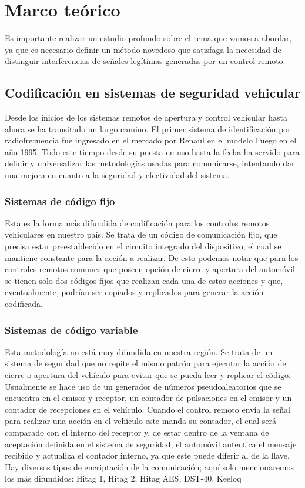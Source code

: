 \documentclass[12pt]{report}
\begin{document}
\section{Marco teórico}


Es importante realizar un estudio profundo sobre el tema que vamos a abordar, ya que es necesario definir un método novedoso que satisfaga
la necesidad de distinguir interferencias de señales legítimas generadas por un control remoto.

\subsection{Codificación en sistemas de seguridad vehicular}

Desde los inicios de los sistemas remotos de apertura y control vehicular hasta ahora se ha transitado un largo camino. 
El primer sistema de identificación por radiofrecuencia fue ingresado en el mercado por Renaul en el modelo Fuego en el año 1995.
Todo este tiempo desde su puesta en uso hasta la fecha ha servido para definir y universalizar las metodologías usadas para comunicarse,
intentando dar una mejora en cuanto a la seguridad y efectividad del sistema.\\

\subsubsection{Sistemas de código fijo}

Esta es la forma más difundida de codificación para los controles remotos vehiculares en nuestro país. Se trata de un código de comunicación
fijo, que precisa estar preestablecido en el circuito integrado del dispositivo, el cual se mantiene constante para la acción a realizar.
De esto podemos notar que para los controles remotos comunes que poseen opción de cierre y apertura del automóvil se tienen solo dos códigos
fijos que realizan cada una de estas acciones y que, eventualmente, podrían ser copiados y replicados para generar la acción codificada. 

\subsubsection{Sistemas de código variable}

Esta metodología no está muy difundida en nuestra región. Se trata de un sistema de seguridad que no repite el mismo patrón para ejecutar la 
acción de cierre o apertura del vehículo para evitar que se pueda leer y replicar el código. Usualmente se hace uso de un generador de números 
pseudoaleatorios que se encuentra en el emisor y receptor, un contador de pulsaciones en el emisor y un contador de recepciones en el vehículo.
Cuando el control remoto envía la señal para realizar una acción en el vehículo este manda su contador, el cual será comparado con el 
interno del receptor y, de estar dentro de la ventana de aceptación definida en el sistema de seguridad, el automóvil autentica el mensaje 
recibido y actualiza el contador interno, ya que este puede diferir al de la llave.
Hay diversos tipos de encriptación de la comunicación; aquí solo mencionaremos los más difundidos: Hitag 1, Hitag 2, Hitag AES, DST-40, Keeloq
\end{document}
